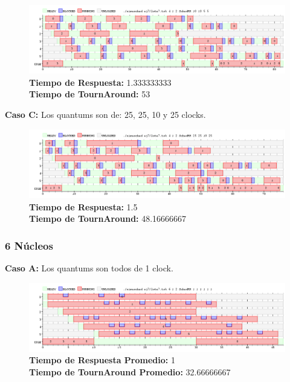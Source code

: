 \documentclass[a4paper]{article}
\begin{document}
			 \begin{figure}[h!]
   \begin{center}
 	\includegraphics[scale=0.5]{imagenes/ej7/4nucleoB.png}
 	\textbf{Tiempo de Respuesta:} 1.333333333 \\
 	\textbf{Tiempo de TournAround:} 53 \\
   \end{center}
 \end{figure} 
 
	\textbf{Caso C:}  Los quantums son de: 25, 25, 10 y 25 clocks.
	
			 \begin{figure}[h!]
   \begin{center}
 	\includegraphics[scale=0.5]{imagenes/ej7/4nucleoC.png}
 	\textbf{Tiempo de Respuesta:} 1.5 \\
 	\textbf{Tiempo de TournAround:} 48.16666667 \\
   \end{center}
 \end{figure} 
 
 \newpage
	\subsubsection*{6 N\'ucleos}
	
	\textbf{Caso A:}  Los quantums son todos de 1 clock.

		 \begin{figure}[h!]
   \begin{center}
 	\includegraphics[scale=0.5]{imagenes/ej7/6nucleoA.png}
 	\textbf{Tiempo de Respuesta Promedio:} 1 \\
 	\textbf{Tiempo de TournAround Promedio:} 32.66666667 \\
   \end{center}
 \end{figure} 
 	
\end{document}
